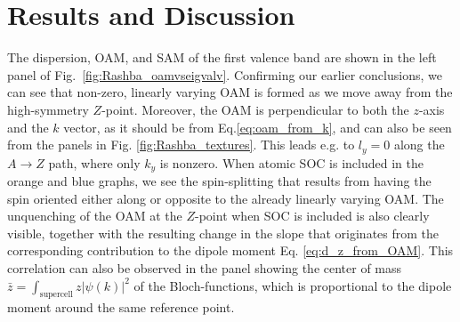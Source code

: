 \section{Results and Discussion}
The dispersion, OAM, and SAM of the first valence band are shown in the left panel of Fig.~\ref{fig:Rashba_oamvseigvalv}. Confirming our earlier conclusions, we can see that non-zero, linearly varying OAM is formed as we move away from the high-symmetry $Z$-point. Moreover, the OAM is perpendicular to both the $z$-axis and the $k$ vector, as it should be from Eq.\ref{eq:oam_from_k}, and can also be seen from the panels in Fig. \ref{fig:Rashba_textures}. This leads e.g. to $l_y=0$ along the $A \to Z$ path, where only $k_y$ is nonzero. When atomic SOC is included in the orange and blue graphs, we see the spin-splitting that results from having the spin oriented either along or opposite to the already linearly varying OAM. The unquenching of the OAM at the $Z$-point when SOC is included is also clearly visible, together with the resulting change in the slope that originates from the corresponding contribution to the dipole moment Eq. \ref{eq:d_z_from_OAM}. This correlation can also be observed in the panel showing the center of mass $\bar{z}=\int_{\textrm{supercell}}z |\psi(k)|^2$ of the Bloch-functions, which is proportional to the dipole moment around the same reference point.

